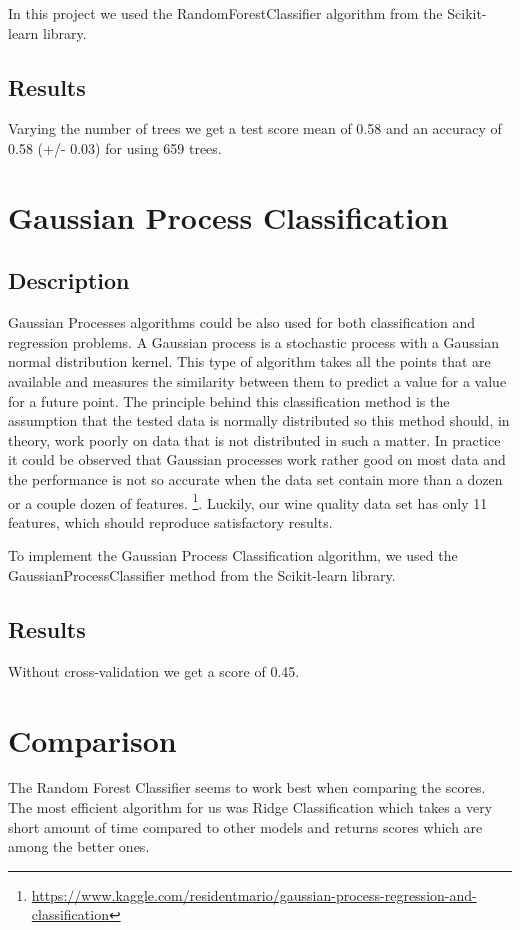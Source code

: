 \documentclass[twocolumn]{scrartcl}
\begin{document}
In this project we used the RandomForestClassifier algorithm from the Scikit-learn library.
\subsection{Results}
Varying the number of trees we get a test score mean of 0.58 and an accuracy of 0.58 (+/- 0.03) for using 659 trees.

\section{Gaussian Process Classification}
\subsection{Description}
Gaussian Processes algorithms could be also used for both classification and regression problems. A Gaussian process is a stochastic process with a Gaussian normal distribution kernel. This type of algorithm takes all the points that are available and measures the similarity between them to predict a value for a value for a future point.
The principle behind this classification method is the assumption that the tested data is normally distributed so this method should, in theory, work poorly on data that is not distributed in such a matter. In practice it could be observed that Gaussian processes work rather good on most data and the performance is not so accurate when the data set contain more than a dozen or a couple dozen of features.
\footnote{\url{https://www.kaggle.com/residentmario/gaussian-process-regression-and-classification}}.
Luckily, our wine quality data set has only 11 features, which should reproduce satisfactory results.

To implement the Gaussian Process Classification algorithm, we used the GaussianProcessClassifier method from the Scikit-learn library.

\subsection{Results}

Without cross-validation we get a score of 0.45.

\section{Comparison}

The Random Forest Classifier seems to work best when comparing the scores. The most efficient algorithm for us was Ridge Classification which takes a very short amount of time compared to other models and returns scores which are among the better ones.
\end{document}
